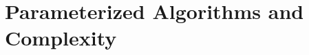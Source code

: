 \documentclass[11pt,a4paper,openany]{book}
\begin{document}
\part{Parameterized Algorithms and Complexity}






\appendix



\backmatter



\end{document}
